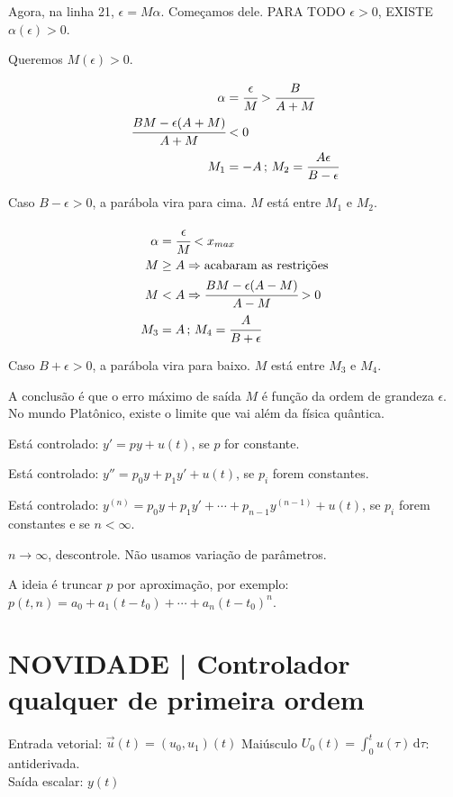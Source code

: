 \documentclass[11pt]{article}
\begin{document}
Agora, na linha 21, $\epsilon = M\alpha $. Come\c{c}amos dele. PARA TODO $\epsilon > 0$, EXISTE $\alpha(\epsilon) > 0$.

Queremos $M(\epsilon) > 0$.

\begin{align}
 \alpha &= \cfrac{\epsilon}{M} > \cfrac{B}{A + M} \\
 \cfrac{BM - \epsilon(A+M)}{A+M} &< 0 \\
 M_1 &= - A \,;\, M_2 = \cfrac{A \epsilon}{B - \epsilon}
\end{align}

Caso $B - \epsilon > 0$, a par\'abola vira para cima. $M$ est\'a entre $M_1$ e $M_2$.

\begin{align}
 \alpha &= \cfrac{\epsilon}{M} < x_{max} \\
 M &\ge A \Rightarrow \text{acabaram as restri\c{c}\~oes} \\
 M &< A \Rightarrow \cfrac{BM - \epsilon(A - M)}{A - M} > 0 \\
 M_3 &= A \,;\, M_4 = \cfrac{A}{B + \epsilon}
\end{align}

Caso $B + \epsilon > 0$, a par\'abola vira para baixo. $M$ est\'a entre $M_3$ e $M_4$.

A conclus\~ao \'e que o erro m\'aximo de sa\'ida $M$ \'e fun\c{c}\~ao da ordem de grandeza $\epsilon$. No mundo Plat\^onico, existe o limite que vai al\'em da f\'isica qu\^antica.

Est\'a controlado: $y' = py + u(t)$, se $p$ for constante.

Est\'a controlado: $y'' = p_0 y + p_1 y' + u(t)$, se $p_i$ forem constantes.

Est\'a controlado: $y^{(n)} = p_0 y + p_1 y' + \cdots + p_{n-1} y^{(n-1)} + u(t)$, se $p_i$ forem constantes e se $n < \infty$.

$n \to \infty$, descontrole. N\~ao usamos varia\c{c}\~ao de par\^ametros.

A ideia \'e truncar $p$ por aproxima\c{c}\~ao, por exemplo: $p(t, n) = a_0 + a_1 (t - t_0) + \cdots + a_n (t - t_0)^n$.

\section{NOVIDADE | Controlador qualquer de primeira ordem}

\begin{flushleft}
Entrada vetorial: $\vec u(t) = (u_0,u_1)(t)$ Mai\'usculo $U_0(t) = \int_0^t u(\tau) \,\mathrm{d}\tau$: antiderivada. \\
Sa\'ida escalar: $y(t)$
\end{flushleft}
\end{document}
